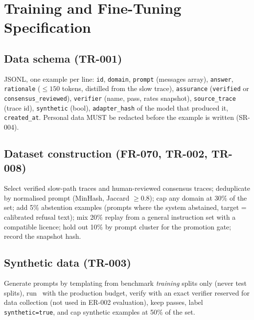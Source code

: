 \documentclass[11pt,a4paper]{article}
\begin{document}
\section{Training and Fine-Tuning Specification}
\label{sec:training}
\subsection{Data schema (TR-001)}
JSONL, one example per line: \texttt{id}, \texttt{domain}, \texttt{prompt} (messages array), \texttt{answer}, \texttt{rationale} ($\le150$ tokens, distilled from the slow trace), \texttt{assurance} (\texttt{verified} or \texttt{consensus\_reviewed}), \texttt{verifier} (name, pass, rates snapshot), \texttt{source\_trace} (trace id), \texttt{synthetic} (bool), \texttt{adapter\_hash} of the model that produced it, \texttt{created\_at}. Personal data MUST be redacted before the example is written (SR-004).
\subsection{Dataset construction (FR-070, TR-002, TR-008)}
Select verified slow-path traces and human-reviewed consensus traces; deduplicate by normalised prompt (MinHash, Jaccard $\ge0.8$); cap any domain at 30\% of the set; add 5\% abstention examples (prompts where the system abstained, target = calibrated refusal text); mix 20\% replay from a general instruction set with a compatible licence; hold out 10\% by prompt cluster for the promotion gate; record the snapshot hash.
\subsection{Synthetic data (TR-003)}
Generate prompts by templating from benchmark \emph{training} splits only (never test splits), run \Stwo\ with the production budget, verify with an exact verifier reserved for data collection (not used in ER-002 evaluation), keep passes, label \texttt{synthetic=true}, and cap synthetic examples at 50\% of the set.
\end{document}
